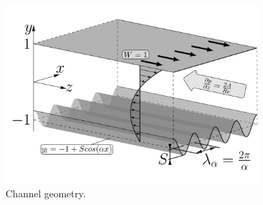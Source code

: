 \documentclass[lineno]{jfm}
\begin{document}
 \begin{figure}
 \centering
 	\includegraphics[width=0.85\textwidth]{geom.png}  
 	\caption{Channel geometry.}
 	\label{fig:geom1}
 \end{figure}
\end{document}
